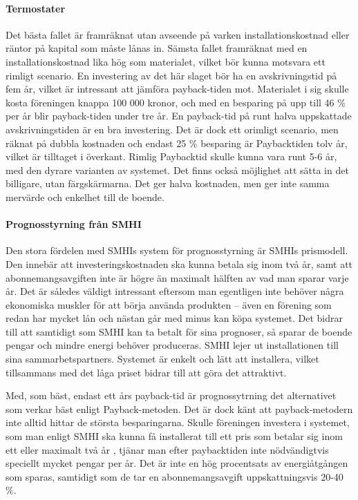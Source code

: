 \paragraph{Termostater}
Det bästa fallet är framräknat utan avseende på varken installationskostnad eller räntor på kapital som måste lånas in. Sämsta fallet framräknat med en installationskostnad lika hög som materialet, vilket bör kunna motsvara ett rimligt scenario. En investering av det här slaget bör ha en avskrivningstid på fem år, vilket är intressant att jämföra payback-tiden mot. Materialet i sig skulle kosta föreningen knappa 100 000 kronor, och med en besparing på upp till 46 \% \cite{danfoss} per år blir payback-tiden under tre år. En payback-tid på runt halva uppskattade avskrivningstiden är en bra investering. Det är dock ett orimligt scenario, men räknat på dubbla kostnaden och endast 25 \% besparing är Paybacktiden tolv år, vilket är tilltaget i överkant. Rimlig Paybacktid skulle kunna vara runt 5-6 år, med den dyrare varianten av systemet. Det finns också möjlighet att sätta in det billigare, utan färgskärmarna. Det ger halva kostnaden, men ger inte samma mervärde och enkelhet till de boende.

\paragraph{Prognosstyrning från SMHI}
Den stora fördelen med SMHIs system för prognosstyrning är SMHIs prismodell. Den innebär att investeringskostnaden ska kunna betala sig inom två år, samt att abonnemangsavgiften inte är högre än maximalt hälften av vad man sparar varje år. Det är således väldigt intressant eftersom man egentligen inte behöver några ekonomiska muskler för att börja använda produkten – även en förening som redan har mycket lån och nästan går med minus kan köpa systemet. Det bidrar till att samtidigt som SMHI kan ta betalt för sina prognoser, så sparar de boende pengar och mindre energi behöver produceras. SMHI lejer ut installationen till sina sammarbetspartners. Systemet är enkelt och lätt att installera, vilket tillsammans med det låga priset bidrar till att göra det attraktivt.

Med, som bäst, endast ett års payback-tid är prognossytrning det alternativet som verkar bäst enligt Payback-metoden. Det är dock känt att payback-metodern inte alltid hittar de största besparingarna. Skulle föreningen investera i systemet, som man enligt SMHI ska kunna få installerat till ett pris som betalar sig inom ett eller maximalt två år \cite{smhi1}\cite{smhi2}, tjänar man efter paybacktiden inte nödvändigtvis speciellt mycket pengar per år. Det är inte en hög procentsats av energiåtgången som sparas, samtidigt som de tar en abonnemangsavgift uppskattningsvis 20-40 \%. \cite{smhi1}\cite{smhi2}

